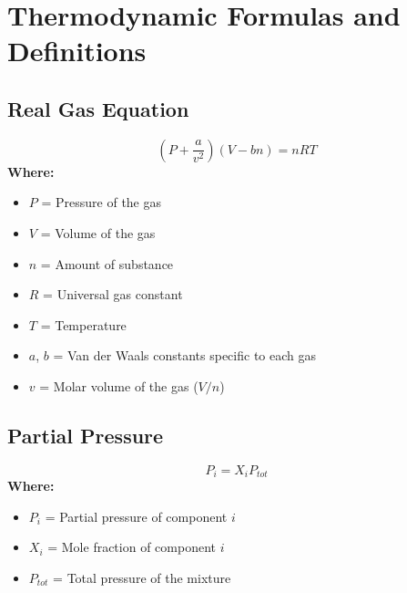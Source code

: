 \documentclass{report}
\begin{document}

\section*{Thermodynamic Formulas and Definitions}

\subsection*{Real Gas Equation}
\[
\left( P + \frac{a}{v^2} \right) (V - bn) = nRT
\]
\textbf{Where:}
\begin{itemize}
    \item $P$ = Pressure of the gas
    \item $V$ = Volume of the gas
    \item $n$ = Amount of substance
    \item $R$ = Universal gas constant
    \item $T$ = Temperature
    \item $a$, $b$ = Van der Waals constants specific to each gas
    \item $v$ = Molar volume of the gas ($V/n$)
\end{itemize}

\subsection*{Partial Pressure}
\[
P_i = X_i P_{tot}
\]
\textbf{Where:}
\begin{itemize}
    \item $P_i$ = Partial pressure of component $i$
    \item $X_i$ = Mole fraction of component $i$
    \item $P_{tot}$ = Total pressure of the mixture
\end{itemize}
\end{document}
